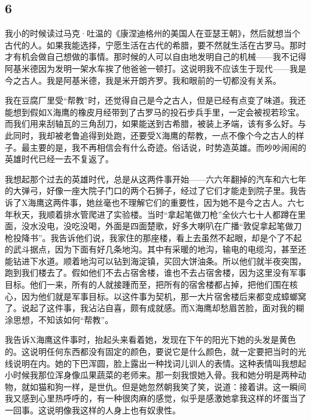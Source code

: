 \subsection{6}

我小的时候读过马克·吐温的《康涅迪格州的美国人在亚瑟王朝》，然后就想当个古代的人。如果我能选择，宁愿生活在古代的希腊，要不然就生活在古罗马。那时才有机会做自己想做的事情。那时候的人可以自由地发明自己的机械——我不记得阿基米德因为发明一架水车挨了他爸爸一顿打。这说明我不应该生于现代——我是今之古人。我是阿基米德，我是米开朗齐罗。我和眼前的一切都没有关系。 

我在豆腐厂里受“帮教”时，还觉得自己是今之古人，但是已经有点变了味道。我还能想到假如X海鹰的橡皮月经带到了古罗马的投石步兵手里，一定会被视若珍宝。而我们用来刮轴瓦的三角刮刀，如果能送到古希腊，被装上矛端，该有多么好。与此同时，我却被老鲁追得到处跑，还要受X海鹰的帮教，一点不像个今之古人的样子。最主要的是，我不再相信会有什么奇迹。俗话说，时势造英雄。而吵吵闹闹的英雄时代已经一去不复返了。 

我想起那个过去的英雄时代，总是从这两件事开始——六六年翻掉的汽车和六七年的大弹弓，好像一座大院子门口的两个石狮子，经过了它们才能走到院子里。我告诉了X海鹰这两件事，她丝毫也不理解它们的重要性，因为她不是今之古人。六七年秋天，我顺着排水管爬进了实验楼。当时“拿起笔做刀枪”全伙六七十人都蹲在里面，没水没电，没吃没喝，外面是四面楚歌，好多大喇叭在广播“敦促拿起笔做刀枪投降书”。我告诉他们说，我家住的那座楼，看上去虽然不起眼，却是个了不起的武斗据点，因为下面有好几条地沟。其中有采暖的地沟，输电的电缆沟，甚至还能钻进下水道。顺着地沟可以钻到海淀镇，买回大饼油条。所以他们就半夜突围，跑到我们楼去了。假如他们不去占宿舍楼，谁也不去占宿舍楼，因为这里没有军事目标。他们一来，所有的人就接踵而至，把所有的宿舍楼都占掉，把他们围在核心，因为他们就是军事目标。以这件事为契机，那一大片宿舍楼后来都变成蟑螂窝了。说起了这件事，我沾沾自喜，颇有成就感。而X海鹰却愁眉苦脸，面对我的糊涂思想，不知该如何“帮教”。 

我告诉X海鹰这件事时，抬起头来看着她，发现在下午的阳光下她的头发是黄色的。这说明任何东西都没有固定的颜色，要说它是什么颜色，就一定要把当时的光线说明在内。她的下巴浑圆，脸上露出一种找词儿训人的表情。这种表情叫我想起小时候我那位浑身像瓜果蔬菜的老师来。那一刻我恨她入骨。我和她分明是两种动物，就如猫和狗一样，是世仇。但是她忽然朝我笑了笑，说道：接着讲。这一瞬间我又感到心里热呼呼的，有一种很肉麻的感觉，似乎是感激她拿我这样的坏蛋当了一回事。这说明像我这样的人身上也有奴隶性。 

